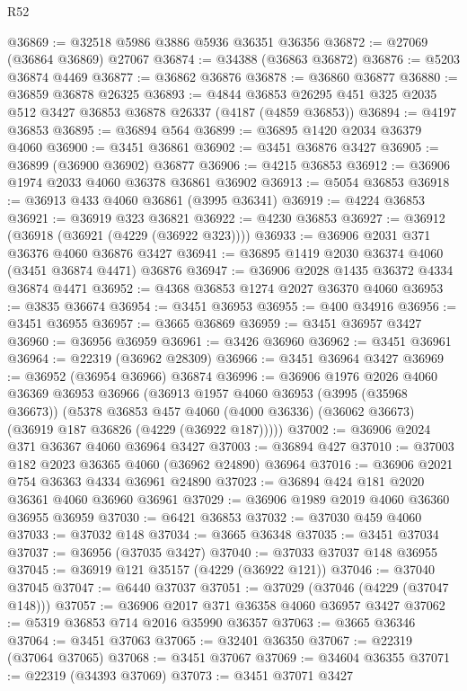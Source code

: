 \begin{lexlean}{R52}
\begin{coremodule}
@36869 := @32518 @5986 @3886 @5936 @36351 @36356
@36872 := @27069 (@36864 @36869) @27067
@36874 := @34388 (@36863 @36872)
@36876 := @5203 @36874 @4469
@36877 := @36862 @36876
@36878 := @36860 @36877
@36880 := @36859 @36878 @26325
@36893 := @4844 @36853 @26295 @451 @325 @2035 @512 @3427 @36853 @36878 @26337 (@4187 (@4859 @36853))
@36894 := @4197 @36853
@36895 := @36894 @564
@36899 := @36895 @1420 @2034 @36379 @4060
@36900 := @3451 @36861
@36902 := @3451 @36876 @3427
@36905 := @36899 (@36900 @36902) @36877
@36906 := @4215 @36853
@36912 := @36906 @1974 @2033 @4060 @36378 @36861 @36902
@36913 := @5054 @36853
@36918 := @36913 @433 @4060 @36861 (@3995 @36341)
@36919 := @4224 @36853
@36921 := @36919 @323 @36821
@36922 := @4230 @36853
@36927 := @36912 (@36918 (@36921 (@4229 (@36922 @323))))
@36933 := @36906 @2031 @371 @36376 @4060 @36876 @3427
@36941 := @36895 @1419 @2030 @36374 @4060 (@3451 @36874 @4471) @36876
@36947 := @36906 @2028 @1435 @36372 @4334 @36874 @4471
@36952 := @4368 @36853 @1274 @2027 @36370 @4060
@36953 := @3835 @36674
@36954 := @3451 @36953
@36955 := @400 @34916
@36956 := @3451 @36955
@36957 := @3665 @36869
@36959 := @3451 @36957 @3427
@36960 := @36956 @36959
@36961 := @3426 @36960
@36962 := @3451 @36961
@36964 := @22319 (@36962 @28309)
@36966 := @3451 @36964 @3427
@36969 := @36952 (@36954 @36966) @36874
@36996 := @36906
    @1976
    @2026
    @4060
    @36369
    @36953
    @36966
    (@36913
      @1957
      @4060
      @36953
      (@3995 (@35968 @36673))
      (@5378
        @36853
        @457
        @4060
        (@4000 @36336)
        (@36062 @36673)
        (@36919 @187 @36826 (@4229 (@36922 @187)))))
@37002 := @36906 @2024 @371 @36367 @4060 @36964 @3427
@37003 := @36894 @427
@37010 := @37003 @182 @2023 @36365 @4060 (@36962 @24890) @36964
@37016 := @36906 @2021 @754 @36363 @4334 @36961 @24890
@37023 := @36894 @424 @181 @2020 @36361 @4060 @36960 @36961
@37029 := @36906 @1989 @2019 @4060 @36360 @36955 @36959
@37030 := @6421 @36853
@37032 := @37030 @459 @4060
@37033 := @37032 @148
@37034 := @3665 @36348
@37035 := @3451 @37034
@37037 := @36956 (@37035 @3427)
@37040 := @37033 @37037 @148 @36955
@37045 := @36919 @121 @35157 (@4229 (@36922 @121))
@37046 := @37040 @37045
@37047 := @6440 @37037
@37051 := @37029 (@37046 (@4229 (@37047 @148)))
@37057 := @36906 @2017 @371 @36358 @4060 @36957 @3427
@37062 := @5319 @36853 @714 @2016 @35990 @36357
@37063 := @3665 @36346
@37064 := @3451 @37063
@37065 := @32401 @36350
@37067 := @22319 (@37064 @37065)
@37068 := @3451 @37067
@37069 := @34604 @36355
@37071 := @22319 (@34393 @37069)
@37073 := @3451 @37071 @3427

\end{coremodule}
\end{lexlean}
